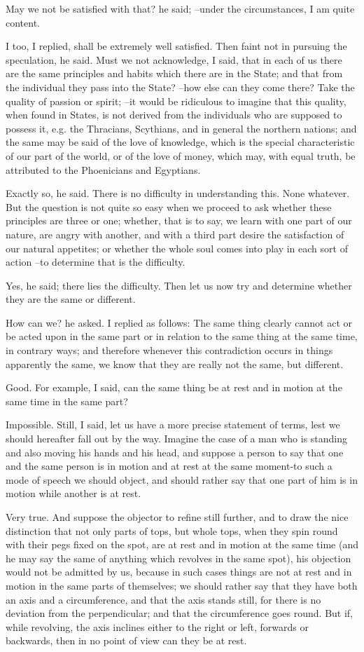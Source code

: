 May we not be satisfied with that? he said; --under the circumstances, I am quite content.

I too, I replied, shall be extremely well satisfied.
Then faint not in pursuing the speculation, he said.
Must we not acknowledge, I said, that in each of us there are the same principles and habits which there are in the State; and that from the individual they pass into the State? --how else can they come there? Take the quality of passion or spirit; --it would be ridiculous to imagine that this quality, when found in States, is not derived from the individuals who are supposed to possess it, e.g. the Thracians, Scythians, and in general the northern nations; and the same may be said of the love of knowledge, which is the special characteristic of our part of the world, or of the love of money, which may, with equal truth, be attributed to the Phoenicians and Egyptians.

Exactly so, he said.
There is no difficulty in understanding this.
None whatever.
But the question is not quite so easy when we proceed to ask whether these principles are three or one; whether, that is to say, we learn with one part of our nature, are angry with another, and with a third part desire the satisfaction of our natural appetites; or whether the whole soul comes into play in each sort of action --to determine that is the difficulty.

Yes, he said; there lies the difficulty.
Then let us now try and determine whether they are the same or different.

How can we? he asked.
I replied as follows: The same thing clearly cannot act or be acted upon in the same part or in relation to the same thing at the same time, in contrary ways; and therefore whenever this contradiction occurs in things apparently the same, we know that they are really not the same, but different.

Good.
For example, I said, can the same thing be at rest and in motion at the same time in the same part?

Impossible.
Still, I said, let us have a more precise statement of terms, lest we should hereafter fall out by the way. Imagine the case of a man who is standing and also moving his hands and his head, and suppose a person to say that one and the same person is in motion and at rest at the same moment-to such a mode of speech we should object, and should rather say that one part of him is in motion while another is at rest.

Very true.
And suppose the objector to refine still further, and to draw the nice distinction that not only parts of tops, but whole tops, when they spin round with their pegs fixed on the spot, are at rest and in motion at the same time (and he may say the same of anything which revolves in the same spot), his objection would not be admitted by us, because in such cases things are not at rest and in motion in the same parts of themselves; we should rather say that they have both an axis and a circumference, and that the axis stands still, for there is no deviation from the perpendicular; and that the circumference goes round. But if, while revolving, the axis inclines either to the right or left, forwards or backwards, then in no point of view can they be at rest.

